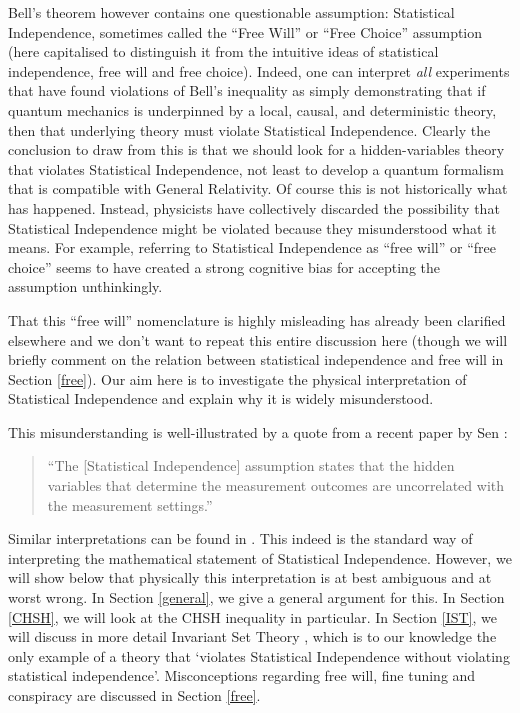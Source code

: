 \documentclass[12pt,superscriptaddress]{revtex4-2}
\begin{document}
Bell's theorem however contains one questionable assumption: Statistical Independence, sometimes called the ``Free Will'' or ``Free Choice'' assumption (here capitalised to distinguish it from the intuitive ideas of statistical independence, free will and free  choice).
Indeed, one can interpret \emph{all} experiments that have found violations of Bell's inequality as simply demonstrating that if quantum mechanics is underpinned by a local, causal, and deterministic theory, then that underlying theory must violate Statistical Independence. Clearly the conclusion to draw from this is that we should look for a hidden-variables theory that violates Statistical Independence, not least to develop a quantum formalism that is compatible with General Relativity. 
Of course this is not historically what has happened. Instead, physicists have collectively discarded the possibility that Statistical Independence might be violated because they misunderstood what it means. For example, referring to Statistical Independence as ``free will'' or ``free choice'' seems to have created a strong cognitive bias for accepting the assumption unthinkingly. 

That this ``free will'' nomenclature is highly misleading has already been clarified elsewhere \cite{Hossenfelder2020Rethinking,Hossenfelder2020SuperdeterminismGuide} and we don't want to repeat this entire discussion here (though we will briefly comment on the relation between statistical independence and free will in Section \ref{free}). Our aim here is to investigate the physical interpretation of Statistical Independence and explain why it is widely misunderstood. 

This misunderstanding is well-illustrated by a quote from a recent paper by Sen \cite{Sen2021Analysis}:
\begin{quote}
``The [Statistical Independence] assumption states that the hidden variables that determine the measurement outcomes are uncorrelated with the measurement settings.''
\end{quote}
Similar interpretations can be found in \cite{Sen2020Superdet1,Sen2020Superdet2}. This indeed is the standard way of interpreting the mathematical statement of Statistical Independence. However, we will show below that physically this interpretation is at best ambiguous and at worst wrong. In Section \ref{general}, we give a general argument for this. In Section \ref{CHSH}, we will look at the {\sc CHSH} inequality in particular. In Section \ref{IST}, we will discuss in more detail Invariant Set Theory \cite{Palmer2020Discretization}, which is to our knowledge the only example of a theory that `violates Statistical Independence without violating statistical independence'. Misconceptions regarding free will, fine tuning and conspiracy are discussed in Section \ref{free}.
\end{document}
